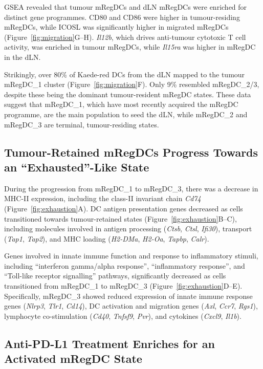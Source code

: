 \documentclass[11pt]{article}
\begin{document}
GSEA revealed that tumour mRegDCs and dLN mRegDCs were enriched for distinct gene programmes. CD80 and CD86 were higher in tumour-residing mRegDCs, while ICOSL was significantly higher in migrated mRegDCs (Figure~\ref{fig:migration}G--H). \textit{Il12b}, which drives anti-tumour cytotoxic T cell activity, was enriched in tumour mRegDCs, while \textit{Il15ra} was higher in mRegDC in the dLN.

Strikingly, over 80\% of Kaede-red DCs from the dLN mapped to the tumour mRegDC\_1 cluster (Figure~\ref{fig:migration}F). Only 9\% resembled mRegDC\_2/3, despite these being the dominant tumour-resident mRegDC states. These data suggest that mRegDC\_1, which have most recently acquired the mRegDC programme, are the main population to seed the dLN, while mRegDC\_2 and mRegDC\_3 are terminal, tumour-residing states.

\subsection{Tumour-Retained mRegDCs Progress Towards an ``Exhausted''-Like State}

During the progression from mRegDC\_1 to mRegDC\_3, there was a decrease in MHC-II expression, including the class-II invariant chain \textit{Cd74} (Figure~\ref{fig:exhaustion}A). DC antigen presentation genes decreased as cells transitioned towards tumour-retained states (Figure~\ref{fig:exhaustion}B--C), including molecules involved in antigen processing (\textit{Ctsb}, \textit{Ctsl}, \textit{Ifi30}), transport (\textit{Tap1}, \textit{Tap2}), and MHC loading (\textit{H2-DMa}, \textit{H2-Oa}, \textit{Tapbp}, \textit{Calr}).

Genes involved in innate immune function and response to inflammatory stimuli, including ``interferon gamma/alpha response'', ``inflammatory response'', and ``Toll-like receptor signalling'' pathways, significantly decreased as cells transitioned from mRegDC\_1 to mRegDC\_3 (Figure~\ref{fig:exhaustion}D--E). Specifically, mRegDC\_3 showed reduced expression of innate immune response genes (\textit{Nlrp3}, \textit{Tlr1}, \textit{Cd14}), DC activation and migration genes (\textit{Axl}, \textit{Ccr7}, \textit{Rgs1}), lymphocyte co-stimulation (\textit{Cd40}, \textit{Tnfsf9}, \textit{Pvr}), and cytokines (\textit{Cxcl9}, \textit{Il1b}).

\subsection{Anti-PD-L1 Treatment Enriches for an Activated mRegDC State}
\end{document}
